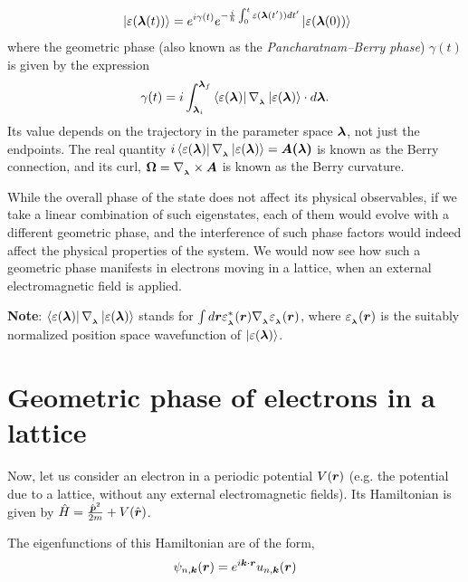 \documentclass{report}
\renewcommand\vec[1]{\ensuremath\boldsymbol{#1}} %
\begin{document}
\begin{equation}~\label{Eq:BerryPhaseOriginal}
	\ket{\varepsilon(\vec{\lambda}(t))} = e^{i \gamma(t)} e^{-\frac{i}{\hbar} \int_0^t \varepsilon(\vec{\lambda}(t')) dt'} \ket{\varepsilon(\vec{\lambda}(0))}
\end{equation}
where the geometric phase (also known as the \textit{Pancharatnam–Berry phase}) $\gamma(t)$ is given by the expression $$\gamma(t) = i\int_{\vec{\lambda}_i}^{\vec{\lambda}_f} \bra{\varepsilon({\vec{\lambda}})}\nabla_{_{\vec{\lambda}}} \ket{\varepsilon({\vec{\lambda}})} \cdot d \vec{\lambda}.$$ Its value depends on the trajectory in the parameter space $\vec{\lambda}$, not just the endpoints. The real quantity $i\bra{\varepsilon({\vec{\lambda}})}\nabla_{_{\vec{\lambda}}}\ket{\varepsilon({\vec{\lambda}})} = \vec{A(\vec{\lambda})}$ is known as the Berry connection, and its curl, $\vec{\Omega} = \nabla_{_{\vec{\lambda}}} \times \vec{A}$ is known as the Berry curvature.

While the overall phase of the state does not affect its physical observables, if we take a linear combination of such eigenstates, each of them would evolve with a different geometric phase, and the interference of such phase factors would indeed affect the physical properties of the system. We would now see how such a geometric phase manifests in electrons moving in a lattice, when an external electromagnetic field is applied.

\textbf{Note}: $\bra{\varepsilon({\vec{\lambda}})}\nabla_{_{\vec{\lambda}}} \ket{\varepsilon({\vec{\lambda}})}$ stands for $\int d\vec{r} \varepsilon_{_{\vec{\lambda}}}^* (\vec{r}) \nabla_{_{\vec{\lambda}}} \varepsilon_{_{\vec{\lambda}}}(\vec{r})$, where $\varepsilon_{_{\vec{\lambda}}}(\vec{r})$ is the suitably normalized position space wavefunction of $\ket{\varepsilon({\vec{\lambda}})}$.

\section{Geometric phase of electrons in a lattice}
Now, let us consider an electron in a periodic potential $V(\vec{r})$ (e.g. the potential due to a lattice, without any external electromagnetic fields). Its Hamiltonian is given by $\hat{H} = \frac{{\hat{\vec{p}}}^2}{2 m} + V(\hat{\vec{r}})$.

The eigenfunctions of this Hamiltonian are of the form,
$$\psi_{n, \vec{k}} (\vec{r}) = e^{i \vec{k}\cdot \vec{r}} u_{n,\vec{k}} (\vec{r})$$
\end{document}
